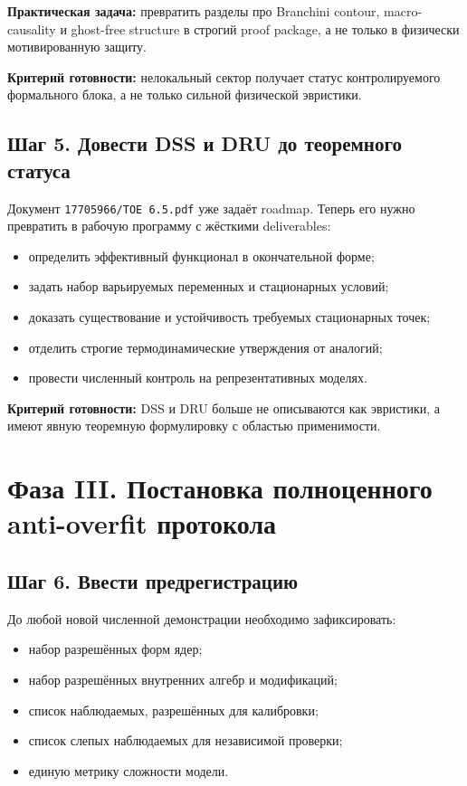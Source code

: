 \documentclass[12pt,a4paper]{article}
\begin{document}
\textbf{Практическая задача:} превратить разделы про Branchini contour, macro-causality и ghost-free structure в строгий proof package, а не только в физически мотивированную защиту.

\textbf{Критерий готовности:} нелокальный сектор получает статус контролируемого формального блока, а не только сильной физической эвристики.

\subsection{Шаг 5. Довести DSS и DRU до теоремного статуса}

Документ \texttt{17705966/ТОЕ 6.5.pdf} уже задаёт roadmap. Теперь его нужно превратить в рабочую программу с жёсткими deliverables:
\begin{itemize}
    \item определить эффективный функционал в окончательной форме;
    \item задать набор варьируемых переменных и стационарных условий;
    \item доказать существование и устойчивость требуемых стационарных точек;
    \item отделить строгие термодинамические утверждения от аналогий;
    \item провести численный контроль на репрезентативных моделях.
\end{itemize}

\textbf{Критерий готовности:} DSS и DRU больше не описываются как эвристики, а имеют явную теоремную формулировку с областью применимости.

\section{Фаза III. Постановка полноценного anti-overfit протокола}

\subsection{Шаг 6. Ввести предрегистрацию}

До любой новой численной демонстрации необходимо зафиксировать:
\begin{itemize}
    \item набор разрешённых форм ядер;
    \item набор разрешённых внутренних алгебр и модификаций;
    \item список наблюдаемых, разрешённых для калибровки;
    \item список слепых наблюдаемых для независимой проверки;
    \item единую метрику сложности модели.
\end{itemize}
\end{document}
